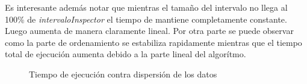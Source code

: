 \documentclass[11pt, a4paper, twoside]{article}
\begin{document}
Es interesante además notar que mientras el tamaño del intervalo no llega al 100\% de \textit{intervaloInspector}
el tiempo de mantiene completamente constante. Luego aumenta de manera claramente lineal. Por otra parte se puede
observar como la parte de ordenamiento se estabiliza rapidamente mientras que el tiempo total de ejecución aumenta debido
a la parte lineal del algorítmo.



\clearpage
\begin{figure}[H]
   \begin{center}
   \caption{Tiempo de ejecución contra dispersión de los datos}
   \label{fig:ej1-3}
   \end{center}
\end{figure}







\end{document}

